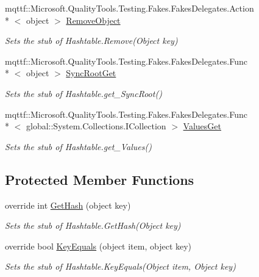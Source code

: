 \begin{DoxyCompactItemize}
mqttf\-::\-Microsoft.\-Quality\-Tools.\-Testing.\-Fakes.\-Fakes\-Delegates.\-Action\\*
$<$ object $>$ \hyperlink{class_system_1_1_collections_1_1_fakes_1_1_stub_hashtable_a1c56b12b6af2b2ee43d5e91e1e0551ed}{Remove\-Object}
\begin{DoxyCompactList}\small\item\em Sets the stub of Hashtable.\-Remove(\-Object key)\end{DoxyCompactList}\item 
mqttf\-::\-Microsoft.\-Quality\-Tools.\-Testing.\-Fakes.\-Fakes\-Delegates.\-Func\\*
$<$ object $>$ \hyperlink{class_system_1_1_collections_1_1_fakes_1_1_stub_hashtable_ab56f464f9952dee6da68a2ec844dfeab}{Sync\-Root\-Get}
\begin{DoxyCompactList}\small\item\em Sets the stub of Hashtable.\-get\-\_\-\-Sync\-Root()\end{DoxyCompactList}\item 
mqttf\-::\-Microsoft.\-Quality\-Tools.\-Testing.\-Fakes.\-Fakes\-Delegates.\-Func\\*
$<$ global\-::\-System.\-Collections.\-I\-Collection $>$ \hyperlink{class_system_1_1_collections_1_1_fakes_1_1_stub_hashtable_a042c81cb1e83b936cd986f4f232d8d34}{Values\-Get}
\begin{DoxyCompactList}\small\item\em Sets the stub of Hashtable.\-get\-\_\-\-Values()\end{DoxyCompactList}\end{DoxyCompactItemize}
\subsection*{Protected Member Functions}
\begin{DoxyCompactItemize}
\item 
override int \hyperlink{class_system_1_1_collections_1_1_fakes_1_1_stub_hashtable_a78b06b34506ae40c2af3261b239a0540}{Get\-Hash} (object key)
\begin{DoxyCompactList}\small\item\em Sets the stub of Hashtable.\-Get\-Hash(\-Object key)\end{DoxyCompactList}\item 
override bool \hyperlink{class_system_1_1_collections_1_1_fakes_1_1_stub_hashtable_af10ae6a594a5dd176095b05d46097996}{Key\-Equals} (object item, object key)
\begin{DoxyCompactList}\small\item\em Sets the stub of Hashtable.\-Key\-Equals(\-Object item, Object key)\end{DoxyCompactList}\end{DoxyCompactItemize}

